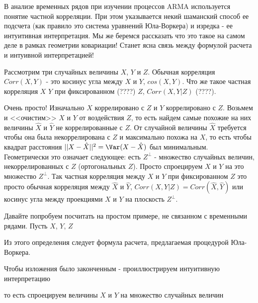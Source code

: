 В анализе временных рядов при изучении процессов ARMA используется понятие частной корреляции. При этом указывается некий шаманский способ ее подсчета (как правило это система уравнений Юла-Воркера) и изредка - ее интуитивная интерпретация. Мы же беремся рассказать что это такое на самом деле в рамках геометрии ковариации! Станет ясна связь между формулой расчета и интуивной интерпретацией!

Рассмотрим три случайных величины $X$, $Y$ и $Z$. Обычная корреляция $Corr(X,Y)$ - это косинус угла между $X$ и $Y$, $cos(X,Y)$. Что же такое частная корреляция $X$ $Y$ при фиксированном (????) $Z$, $Corr(X,Y|Z)$ (????).

Очень просто! Изначально $X$ коррелировано с $Z$ и $Y$ коррелировано с $Z$. Возьмем и <<очистим>> $X$ и $Y$ от воздействия $Z$, то есть найдем самые похожие на них величины $\hat{X}$ и $\hat{Y}$ не коррелированные с $Z$. От случайной величины $\hat{X}$ требуется чтобы она была некоррелирована с $Z$ и максимально похожа на $X$, то есть чтобы квадрат расстояния $||X-\hat{X}||^{2}=\Var(X-\hat{X})$ был минимальным. Геометрически это означает следующее: есть $Z^{\bot}$ - множество случайных величин, некоррелированных с $Z$ (ортогональных $Z$). Просто спроецируем $X$ и $Y$ на это множество $Z^{\bot}$. Так частная корреляция между $X$ и $Y$ при фиксированном $Z$ это просто обычная корреляция между $\hat{X}$ и $\hat{Y}$, $Corr(X,Y|Z)=Corr(\hat{X},\hat{Y})$ или косинус угла между проекциями $X$ и $Y$ на плоскость $Z^{\bot}$. 

Давайте попробуем посчитать на простом примере, не связанном с временными рядами.
Пусть $X$, $Y$, $Z$




Из этого определения следует формула расчета, предлагаемая процедурой Юла-Воркера.








Чтобы изложения было законченным - проиллюстрируем интуитивную интерпретацию 



 то есть спроецируем величины $X$ и $Y$ на множество случайных величин





